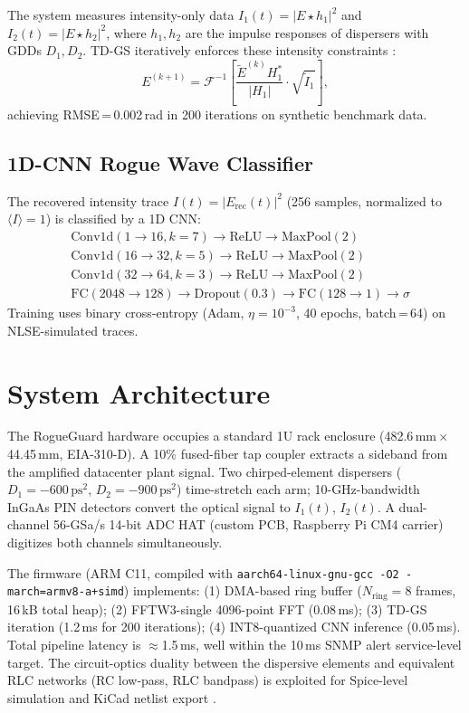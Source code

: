 \documentclass[10pt,twocolumn]{article}
\begin{document}
The system measures intensity-only data $I_1(t) = |E \star h_1|^2$ and
$I_2(t) = |E \star h_2|^2$, where $h_1, h_2$ are the impulse responses
of dispersers with GDDs $D_1, D_2$.
TD-GS iteratively enforces these intensity constraints \cite{Chou2007}:
\begin{equation}
  E^{(k+1)} = \mathcal{F}^{-1}\!\left[
    \frac{\tilde{E}^{(k)} H_1^*}{|H_1|}
    \cdot \sqrt{\tilde{I}_1}
  \right],
\end{equation}
achieving RMSE\,=\,0.002\,rad in 200 iterations on
synthetic benchmark data.

\subsection{1D-CNN Rogue Wave Classifier}

The recovered intensity trace $I(t) = |E_\text{rec}(t)|^2$ (256 samples,
normalized to $\langle I\rangle = 1$) is classified by a 1D CNN:
\begin{align*}
  &\text{Conv1d}(1\to16, k=7) \to \text{ReLU} \to \text{MaxPool}(2)\\
  &\text{Conv1d}(16\to32, k=5) \to \text{ReLU} \to \text{MaxPool}(2)\\
  &\text{Conv1d}(32\to64, k=3) \to \text{ReLU} \to \text{MaxPool}(2)\\
  &\text{FC}(2048\to128) \to \text{Dropout}(0.3) \to \text{FC}(128\to1) \to \sigma
\end{align*}
Training uses binary cross-entropy (Adam, $\eta=10^{-3}$, 40 epochs,
batch\,=\,64) on NLSE-simulated traces.

\section{System Architecture}
\label{sec:arch}

The RogueGuard hardware occupies a standard 1U rack enclosure
(482.6\,mm\,$\times$\,44.45\,mm, EIA-310-D).
A 10\% fused-fiber tap coupler extracts a sideband from the amplified
datacenter plant signal.
Two chirped-element dispersers ($D_1 = -600\,\text{ps}^2$,
$D_2 = -900\,\text{ps}^2$) time-stretch each arm; 10-GHz-bandwidth
InGaAs PIN detectors convert the optical signal to $I_1(t)$, $I_2(t)$.
A dual-channel 56-GSa/s 14-bit ADC HAT (custom PCB, Raspberry Pi CM4
carrier) digitizes both channels simultaneously.

The firmware (ARM C11, compiled with \texttt{aarch64-linux-gnu-gcc -O2
-march=armv8-a+simd}) implements:
(1) DMA-based ring buffer ($N_\text{ring}=8$ frames, 16\,kB total heap);
(2) FFTW3-single 4096-point FFT (0.08\,ms);
(3) TD-GS iteration (1.2\,ms for 200 iterations);
(4) INT8-quantized CNN inference (0.05\,ms).
Total pipeline latency is $\approx$1.5\,ms, well within the 10\,ms SNMP
alert service-level target.
The circuit-optics duality between the dispersive elements and equivalent
RLC networks (RC low-pass, RLC bandpass) is exploited for Spice-level
simulation and KiCad netlist export \cite{Jalali2024SPICE}.
\end{document}
